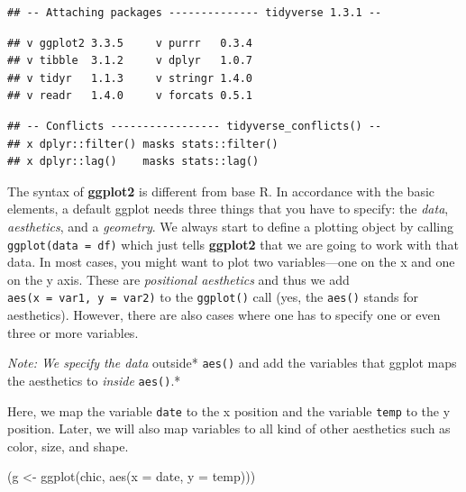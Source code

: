 \documentclass[
]{krantz}
\makeatletter
\newenvironment{Shaded}{\begin{snugshade}}{\end{snugshade}}
\newcommand{\AttributeTok}[1]{\textcolor[rgb]{0.61,0.61,0.61}{#1}}
\newcommand{\FunctionTok}[1]{\textcolor[rgb]{0,0,0}{#1}}
\newcommand{\NormalTok}[1]{#1}
\newcommand{\OtherTok}[1]{\textcolor[rgb]{0.37,0.37,0.37}{#1}}
\newenvironment{kframe}{%
\medskip{}
\setlength{\fboxsep}{.8em}
 \def\at@end@of@kframe{}%
 \ifinner\ifhmode%
  \def\at@end@of@kframe{\end{minipage}}%
  \begin{minipage}{\columnwidth}%
 \fi\fi%
 \def\FrameCommand##1{\hskip\@totalleftmargin \hskip-\fboxsep
 \colorbox{shadecolor}{##1}\hskip-\fboxsep
     \hskip-\linewidth \hskip-\@totalleftmargin \hskip\columnwidth}%
 \MakeFramed {\advance\hsize-\width
   \@totalleftmargin\z@ \linewidth\hsize
   \@setminipage}}%
 {\par\unskip\endMakeFramed%
 \at@end@of@kframe}
\renewenvironment{Shaded}{\begin{kframe}}{\end{kframe}}
\makeatother
\begin{document}
\begin{verbatim}
## -- Attaching packages -------------- tidyverse 1.3.1 --
\end{verbatim}

\begin{verbatim}
## v ggplot2 3.3.5     v purrr   0.3.4
## v tibble  3.1.2     v dplyr   1.0.7
## v tidyr   1.1.3     v stringr 1.4.0
## v readr   1.4.0     v forcats 0.5.1
\end{verbatim}

\begin{verbatim}
## -- Conflicts ----------------- tidyverse_conflicts() --
## x dplyr::filter() masks stats::filter()
## x dplyr::lag()    masks stats::lag()
\end{verbatim}

The syntax of \textbf{ggplot2} is different from base R. In accordance with the basic elements, a default ggplot needs three things that you have to specify: the \emph{data}, \emph{aesthetics}, and a \emph{geometry}. We always start to define a plotting object by calling \texttt{ggplot(data\ =\ df)} which just tells \textbf{ggplot2} that we are going to work with that data. In most cases, you might want to plot two variables---one on the x and one on the y axis. These are \emph{positional aesthetics} and thus we add \texttt{aes(x\ =\ var1,\ y\ =\ var2)} to the \texttt{ggplot()} call (yes, the \texttt{aes()} stands for aesthetics). However, there are also cases where one has to specify one or even three or more variables.

\emph{Note: We specify the data }outside* \texttt{aes()} and add the variables that ggplot maps the aesthetics to \emph{inside} \texttt{aes()}.*

Here, we map the variable \texttt{date} to the x position and the variable \texttt{temp} to the y position. Later, we will also map variables to all kind of other aesthetics such as color, size, and shape.

\begin{Shaded}
\begin{Highlighting}[]
\NormalTok{(g }\OtherTok{\textless{}{-}} \FunctionTok{ggplot}\NormalTok{(chic, }\FunctionTok{aes}\NormalTok{(}\AttributeTok{x =}\NormalTok{ date, }\AttributeTok{y =}\NormalTok{ temp)))}
\end{Highlighting}
\end{Shaded}
\end{document}
